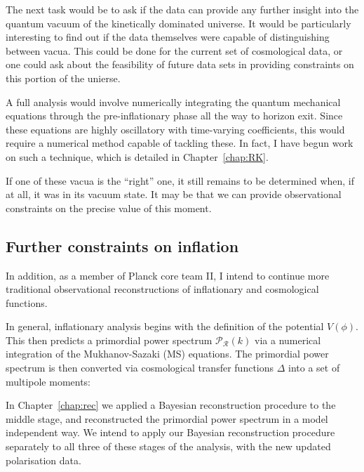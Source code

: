 The next task would be to ask if the data can provide any further insight into the quantum vacuum of the kinetically dominated universe. It would be particularly interesting to find out if the data themselves were capable of distinguishing between vacua. This could be done for the current set of cosmological data, or one could ask about the feasibility of future data sets in providing constraints on this portion of the unierse.

A full analysis would involve numerically integrating the quantum mechanical equations through the pre-inflationary phase all the way to horizon exit. Since these equations are highly oscillatory with time-varying coefficients, this would require a numerical method capable of tackling these. In fact, I have begun work on such a technique, which is detailed in Chapter~\ref{chap:RK}.

If one of these vacua is the ``right'' one, it still remains to be determined when, if at all, it was in its vacuum state. It may be that we can provide observational constraints on the precise value of this moment.

\subsection{Further constraints on inflation}
In addition, as a member of Planck core team II, I intend to continue more traditional observational reconstructions of inflationary and cosmological functions.

In general, inflationary analysis begins with the definition of the potential $V(\phi)$. This then predicts a primordial power spectrum $\mathcal{P}_\mathcal{R}(k)$ via a numerical integration of the Mukhanov-Sazaki (MS) equations. The primordial power spectrum is then converted via cosmological transfer functions $\Delta$ into a set of multipole moments:

\begin{center}
\end{center}

In Chapter~\ref{chap:rec} we applied a Bayesian reconstruction procedure to the middle stage, and reconstructed the primordial power spectrum in a model independent way.  
We intend to apply our Bayesian reconstruction procedure separately to all three of these stages of the analysis, with the new updated polarisation data.

